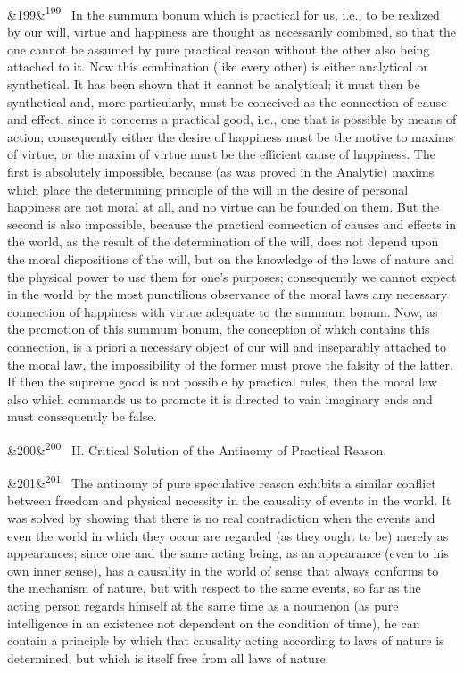 \documentclass[12pt]{article}
\newcommand{\para}[1][]{\par\noindent\ifx&#1&\else\textsuperscript{\footnotesize #1}~\fi}
\begin{document}
\para[199] In the summum bonum which is practical for us, i.e., to be realized by our will, virtue and happiness are thought as necessarily combined, so that the one cannot be assumed by pure practical reason without the other also being attached to it. Now this combination (like every other) is either analytical or synthetical. It has been shown that it cannot be analytical; it must then be synthetical and, more particularly, must be conceived as the connection of cause and effect, since it concerns a practical good, i.e., one that is possible by means of action; consequently either the desire of happiness must be the motive to maxims of virtue, or the maxim of virtue must be the efficient cause of happiness. The first is absolutely impossible, because (as was proved in the Analytic) maxims which place the determining principle of the will in the desire of personal happiness are not moral at all, and no virtue can be founded on them. But the second is also impossible, because the practical connection of causes and effects in the world, as the result of the determination of the will, does not depend upon the moral dispositions of the will, but on the knowledge of the laws of nature and the physical power to use them for one's purposes; consequently we cannot expect in the world by the most punctilious observance of the moral laws any necessary connection of happiness with virtue adequate to the summum bonum. Now, as the promotion of this summum bonum, the conception of which contains this connection, is a priori a necessary object of our will and inseparably attached to the moral law, the impossibility of the former must prove the falsity of the latter. If then the supreme good is not possible by practical rules, then the moral law also which commands us to promote it is directed to vain imaginary ends and must consequently be false.

\para[200] II. Critical Solution of the Antinomy of Practical Reason.

\para[201] The antinomy of pure speculative reason exhibits a similar conflict between freedom and physical necessity in the causality of events in the world. It was solved by showing that there is no real contradiction when the events and even the world in which they occur are regarded (as they ought to be) merely as appearances; since one and the same acting being, as an appearance (even to his own inner sense), has a causality in the world of sense that always conforms to the mechanism of nature, but with respect to the same events, so far as the acting person regards himself at the same time as a noumenon (as pure intelligence in an existence not dependent on the condition of time), he can contain a principle by which that causality acting according to laws of nature is determined, but which is itself free from all laws of nature.
\end{document}
